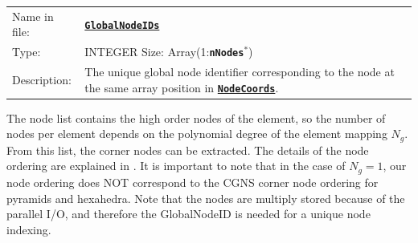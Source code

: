\documentclass[a4paper,headsepline]{scrreprt}
\newcommand\rf[1]{\prettyref{#1}}
\newcommand\Ngeo{N_g}
\newcommand\ttbf[1]{\texttt{\textbf{#1}}}
\newcommand\NodeCoords{\hyperlink{NodeInfo}{\ttbf{NodeCoords}}\xspace}
\newcommand\GlobalNodeIDs{\hyperlink{NodeInfo}{\ttbf{GlobalNodeIDs}}\xspace}
\newcommand\nNodes{\ttbf{nNodes}\xspace}
\begin{document}
\begin{tabularx}{1.0\textwidth}{lX}
Name in file: & \GlobalNodeIDs\\
Type:         & INTEGER \quad Size: Array(1:\nNodes$^*$) \\
Description:  & The unique global node identifier corresponding to the node at the same array position in \NodeCoords.\\
\end{tabularx}
The node list contains the high order nodes of the element, so the number of nodes per element depends on the polynomial degree of the element mapping $\Ngeo$. From this list, the corner nodes can be extracted. The details of the node ordering are explained in \rf{sec:elemnodes}. It is important to note that in the case of $\Ngeo=1$, our node ordering does NOT correspond to the CGNS corner node ordering for pyramids and hexahedra. Note that the nodes are multiply stored because of the parallel I/O, and therefore the GlobalNodeID is needed for a unique node indexing.
\end{document}
